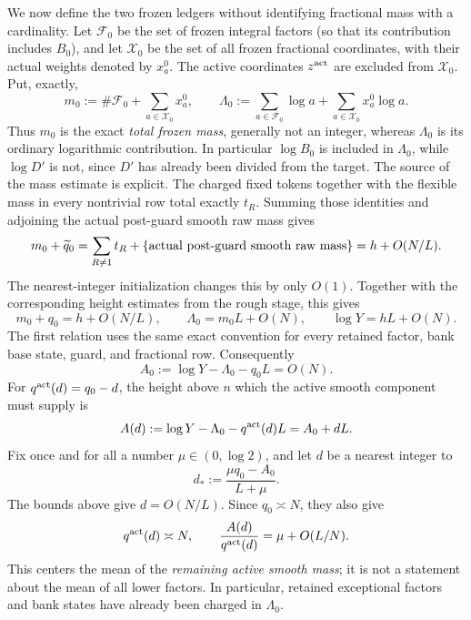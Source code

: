 \documentclass[11pt]{article}
\numberwithin{equation}{section}
\theoremstyle{definition}
\theoremstyle{remark}
\newcommand{\1}{\mathbf 1}
\begin{document}
We now define the two frozen ledgers without identifying fractional mass
with a cardinality.  Let \(\mathscr F_0\) be the set of frozen integral
factors (so that its contribution includes \(B_0\)), and let
\(\mathscr X_0\) be the set of all frozen fractional coordinates, with
their actual weights denoted by \(x_a^0\).  The active coordinates
\(z^{\rm act}\) are excluded from \(\mathscr X_0\).  Put, exactly,
\begin{equation}
 m_0:=\#\mathscr F_0+\sum_{a\in\mathscr X_0}x_a^0,
 \qquad
 \Lambda_0:=\sum_{a\in\mathscr F_0}\log a
       +\sum_{a\in\mathscr X_0}x_a^0\log a.
 \label{eq:smooth-frozen-mass-log-definition}
\end{equation}
Thus \(m_0\) is the exact \emph{total frozen mass}, generally not an
integer, whereas \(\Lambda_0\) is its ordinary logarithmic contribution.
In particular \(\log B_0\) is included in \(\Lambda_0\), while
\(\log D'\) is not, since \(D'\) has already been divided from the
target.  The source of the mass estimate is explicit.  The charged fixed
tokens together with the flexible mass in every nontrivial row total
exactly \(t_R\).  Summing those identities and adjoining the actual
post-guard smooth raw mass gives
\[
 m_0+\widetilde q_0
 =\sum_{R\ne1}t_R+
   \{\hbox{actual post-guard smooth raw mass}\}
 =h+O(N/L).
\]
The nearest-integer initialization changes this by only \(O(1)\).
Together with the corresponding height estimates from the rough stage,
this gives
\begin{equation}
 m_0+q_0=h+O(N/L),\qquad
 \Lambda_0=m_0L+O(N),\qquad
 \log Y=hL+O(N).
\label{eq:smooth-baseline-height-ledger}
\end{equation}
The first relation uses the same exact convention for every retained
factor, bank base state, guard, and fractional row.  Consequently
\[
 A_0:=\log Y-\Lambda_0-q_0L=O(N).
\]
For \(q^{\rm act}(d)=q_0-d\), the height above \(n\) which the active
smooth component must supply is
\begin{equation}
 A(d):=\log Y-\Lambda_0-q^{\rm act}(d)L=A_0+dL.
\label{eq:smooth-active-height}
\end{equation}
Fix once and for all a number \(\mu\in(0,\log2)\), and let \(d\) be a
nearest integer to
\begin{equation}
 d_*:=\frac{\mu q_0-A_0}{L+\mu}.
\label{eq:smooth-height-center}
\end{equation}
The bounds above give \(d=O(N/L)\).  Since \(q_0\asymp N\), they also
give
\begin{equation}
 q^{\rm act}(d)\asymp N,\qquad
 \frac{A(d)}{q^{\rm act}(d)}
        =\mu+O(L/N).
\label{eq:smooth-physical-interiority}
\end{equation}
This centers the mean of the \emph{remaining active smooth mass}; it is
not a statement about the mean of all lower factors.  In particular,
retained exceptional factors and bank states have already been charged
in \(\Lambda_0\).
\end{document}
